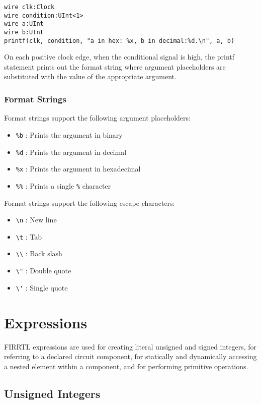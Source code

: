 \documentclass[12pt]{article}
\begin{document}
\begin{verbatim}
wire clk:Clock
wire condition:UInt<1>
wire a:UInt
wire b:UInt
printf(clk, condition, "a in hex: %x, b in decimal:%d.\n", a, b)
\end{verbatim}

On each positive clock edge, when the conditional signal is high, the printf statement prints out the format string where argument placeholders are substituted with the value of the appropriate argument.

\subsubsection{Format Strings}

Format strings support the following argument placeholders:
\begin{itemize}
\item \verb|%b| : Prints the argument in binary
\item \verb|%d| : Prints the argument in decimal
\item \verb|%x| : Prints the argument in hexadecimal
\item \verb|%%| : Prints a single \verb|%| character
\end{itemize}

Format strings support the following escape characters:
\begin{itemize}
\item \verb|\n| : New line
\item \verb|\t| : Tab
\item \verb|\\| : Back slash
\item \verb|\"| : Double quote
\item \verb|\'| : Single quote
\end{itemize}

\section{Expressions}

FIRRTL expressions are used for creating literal unsigned and signed integers, for referring to a declared circuit component, for statically and dynamically accessing a nested element within a component, and for performing primitive operations. 

\subsection{Unsigned Integers}
\end{document}
